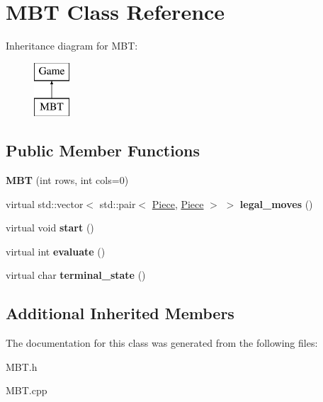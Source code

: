 \hypertarget{class_m_b_t}{}\section{M\+BT Class Reference}
\label{class_m_b_t}
Inheritance diagram for M\+BT\+:\begin{figure}[H]
\begin{center}
\leavevmode
\includegraphics[height=2.000000cm]{class_m_b_t}
\end{center}
\end{figure}
\subsection*{Public Member Functions}
\begin{DoxyCompactItemize}
\item 
\mbox{\label{class_m_b_t_a443c36b0b0281555ead87d21ff92082a}} 
{\bfseries M\+BT} (int rows, int cols=0)
\item 
\mbox{\label{class_m_b_t_add9f32f140d4c6fb5e160eadeddd6738}} 
virtual std\+::vector$<$ std\+::pair$<$ \hyperlink{class_piece}{Piece}, \hyperlink{class_piece}{Piece} $>$ $>$ {\bfseries legal\+\_\+moves} ()
\item 
\mbox{\label{class_m_b_t_aa951382dfec95e214ba1e63189977d8f}} 
virtual void {\bfseries start} ()
\item 
\mbox{\label{class_m_b_t_a62bfe73fc6dd6da20650f27024dd0115}} 
virtual int {\bfseries evaluate} ()
\item 
\mbox{\label{class_m_b_t_ac0b5fc7a538c643ce69a678407fa9f56}} 
virtual char {\bfseries terminal\+\_\+state} ()
\end{DoxyCompactItemize}
\subsection*{Additional Inherited Members}


The documentation for this class was generated from the following files\+:\begin{DoxyCompactItemize}
\item 
M\+B\+T.\+h\item 
M\+B\+T.\+cpp\end{DoxyCompactItemize}

